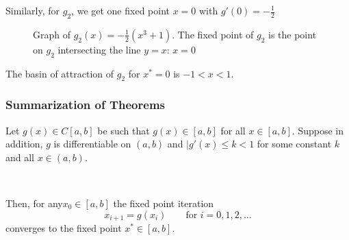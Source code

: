 \begin{example}
    Similarly, for \( g_2 \), we get one fixed point \( x = 0 \) with \( g'(0) = -\frac{1}{2} \)

    \begin{figure}[H]
        \centering
        \caption{Graph of \( g_2(x) = -\frac{1}{2} (x^3 + 1) \). The fixed point of \( g_2 \) is the point on \( g_2 \) intersecting the line \( y = x \): \( x = 0 \)}
    \end{figure}

    The basin of attraction of \( g_2 \) for \( x^\ast = 0 \) is \( -1 < x < 1 \).
\end{example}

\subsubsection{Summarization of Theorems}

\begin{remark}
    Let \( g(x) \in C[a, b] \) be such that \( g(x) \in [a, b] \) for all \( x \in [a, b] \). Suppose in addition, \( g \) is differentiable on \( (a, b) \) and \( |g'(x) \leq k < 1 \) for some constant \( k \) and all \( x \in (a, b) \).

        {~~~}

    Then, for any\( x_0 \in [a, b] \) the fixed point iteration \[
        x_{i+1} = g(x_i) \qquad \text{for } i = 0, 1, 2, \dots
    \] converges to the fixed point \( x^\ast \in [a, b] \).
\end{remark}

